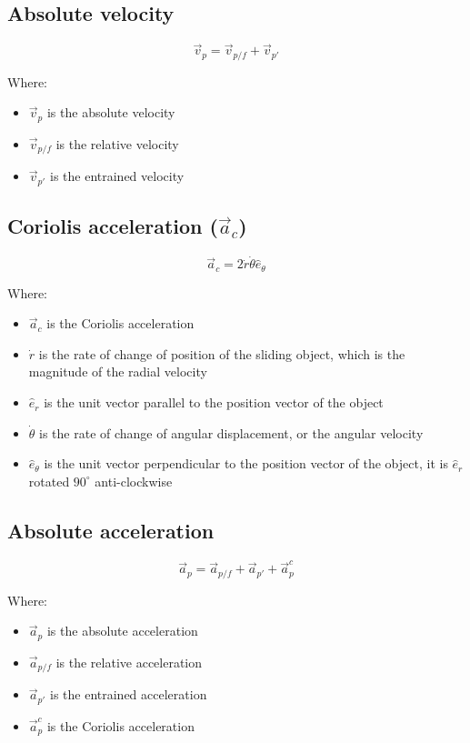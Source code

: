 \documentclass[11pt]{article}
\begin{document}
\subsection{Absolute velocity}
\label{sec:orge643fb0}
\[\vec{v}_p = \vec{v}_{p/f} + \vec{v}_{p'}\]

Where:
\begin{itemize}
\item \(\vec{v}_p\) is the absolute velocity
\item \(\vec{v}_{p/f}\) is the relative velocity
\item \(\vec{v}_{p'}\) is the entrained velocity
\end{itemize}

 \newpage

\subsection{Coriolis acceleration (\(\vec{a}_c\))}
\label{sec:org9d057b5}
\[\vec{a}_c = 2 \dot{r} \dot{\theta} \hat{e}_{\theta}\]

Where:
\begin{itemize}
\item \(\vec{a}_c\) is the Coriolis acceleration
\item \(\dot{r}\) is the rate of change of position of the sliding object, which is the magnitude of the radial velocity
\item \(\hat{e}_r\) is the unit vector parallel to the position vector of the object
\item \(\dot{\theta}\) is the rate of change of angular displacement, or the angular velocity
\item \(\hat{e}_{\theta}\) is the unit vector perpendicular to the position vector of the object, it is \(\hat{e}_r\) rotated \(90^{\circ}\) anti-clockwise
\end{itemize}

\subsection{Absolute acceleration}
\label{sec:orgf0574ee}
\[\vec{a}_p = \vec{a}_{p/f} + \vec{a}_{p'} + \vec{a}_p^c\]

Where:
\begin{itemize}
\item \(\vec{a}_p\) is the absolute acceleration
\item \(\vec{a}_{p/f}\) is the relative acceleration
\item \(\vec{a}_{p'}\) is the entrained acceleration
\item \(\vec{a}_p^c\) is the Coriolis acceleration
\end{itemize}
\end{document}
